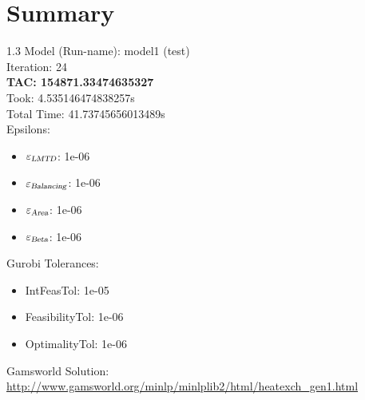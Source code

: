 \documentclass{article}%
\begin{document}
%
\normalsize%
\section{Summary}%
\thispagestyle{plain}%
\begin{spacing}{1.3}%
\Large%
Model (Run-name): model1 (test)\\%
Iteration: 24\\%
\textbf{TAC: 154871.33474635327}\\%
Took: 4.535146474838257s\\%
Total Time: 41.73745656013489s\\%
Epsilons:%
\begin{itemize}%
	\item $\varepsilon_{\textsl{LMTD}}$: 1e-06%
	\item $\varepsilon_{\textsl{Balancing}}$: 1e-06%
	\item $\varepsilon_{\textsl{Area}}$: 1e-06%
	\item $\varepsilon_{\textsl{Beta}}$: 1e-06%
\end{itemize}%
Gurobi Tolerances:%
\begin{itemize}%
	\item IntFeasTol: 1e-05%
	\item FeasibilityTol: 1e-06%
	\item OptimalityTol: 1e-06%
\end{itemize}%
\end{spacing}%
\normalsize%
Gamsworld Solution: \url{http://www.gamsworld.org/minlp/minlplib2/html/heatexch_gen1.html}%
%
\clearpage%
\end{document}
